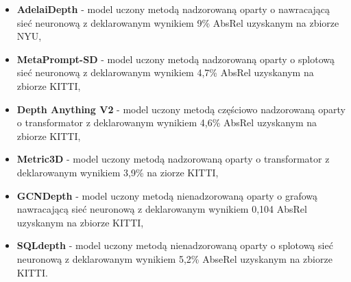 \begin{itemize} 
    \item \textbf{AdelaiDepth} - model uczony metodą nadzorowaną oparty o nawracającą sieć neuronową z deklarowanym wynikiem 9\% AbsRel uzyskanym na zbiorze NYU,
    \item \textbf{MetaPrompt-SD} - model uczony metodą nadzorowaną oparty o splotową sieć neuronową z deklarowanym wynikiem 4,7\% AbsRel uzyskanym na zbiorze KITTI, 
    \item \textbf{Depth Anything V2} - model uczony metodą częściowo nadzorowaną oparty o transformator z deklarowanym wynikiem 4,6\% AbsRel uzyskanym na zbiorze KITTI, 
    \item \textbf{Metric3D} - model uczony metodą nadzorowaną oparty o transformator z deklarowanym wynikiem 3,9\% na ziorze KITTI, 
    \item \textbf{GCNDepth} - model uczony metodą nienadzorowaną oparty o grafową nawracającą sieć neuronową z deklarowanym wynikiem 0,104 AbsRel uzyskanym na zbiorze KITTI,
    \item \textbf{SQLdepth} - model uczony metodą nienadzorowaną oparty o splotową sieć neuronową z deklarowanym wynikiem 5,2\% AbseRel uzyskanym na zbiorze KITTI.
\end{itemize}